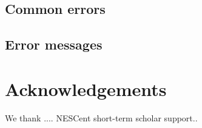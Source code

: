 \documentclass[12pt,letterpaper]{article}
\begin{document}
\subsection{Common errors}
\subsection{Error messages}


\bigskip\section{Acknowledgements}
We thank .... NESCent short-term scholar support.. 

%
%
%
%
%
%
%





\end{document}
